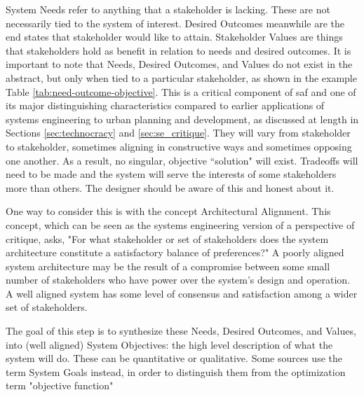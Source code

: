 System Needs refer to anything that a stakeholder is lacking. These are not necessarily tied to the system of interest. Desired Outcomes meanwhile are the end states that stakeholder would like to attain. Stakeholder Values are things that stakeholders hold as benefit in relation to needs and desired outcomes. It is important to note that Needs, Desired Outcomes, and Values do not exist in the abstract, but only when tied to a particular stakeholder, as shown in the example Table \ref{tab:need-outcome-objective}. This is a critical component of \ac{saf} and one of its major distinguishing characteristics compared to earlier applications of systems engineering to urban planning and development, as discussed at length in Sections \ref{sec:technocracy} and \ref{sec:se_critique}. They will vary from stakeholder to stakeholder, sometimes aligning in constructive ways and sometimes opposing one another. As a result, no singular, objective ``solution" will exist. Tradeoffs will need to be made and the system will serve the interests of some stakeholders more than others. The designer should be aware of this and honest about it.

One way to consider this is with the concept Architectural Alignment. This concept, which can be seen as the systems engineering version of a perspective of critique, asks, "For what stakeholder or set of stakeholders does the system architecture constitute a satisfactory balance of preferences?" A poorly aligned system architecture may be the result of a compromise between some small number of stakeholders who have power over the system's design and operation. A well aligned system has some level of consensus and satisfaction among a wider set of stakeholders.

The goal of this step is to synthesize these Needs, Desired Outcomes, and Values, into (well aligned) System Objectives: the high level description of what the system will do. These can be quantitative or qualitative. Some sources use the term System Goals instead, in order to distinguish them from the optimization term "objective function" \cite{nasaofficeofthechiefengineerNASASystemsEngineering2004}

